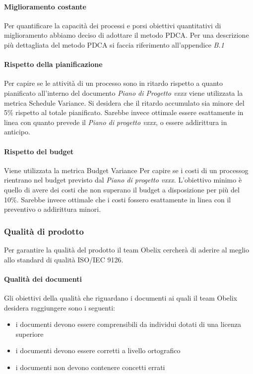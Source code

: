 \paragraph{Miglioramento costante}
Per quantificare la capacità dei processi e porsi obiettivi quantitativi di miglioramento abbiamo deciso di adottare il metodo PDCA. Per una descrizione più dettagliata del metodo PDCA si faccia riferimento all'appendice \emph{B.1}

\paragraph{Rispetto della pianificazione}
Per capire se le attività di un processo sono in ritardo rispetto a quanto pianificato all'interno del documento \emph{Piano di Progetto vxxx} viene utilizzata la metrica Schedule Variance. Si desidera che il ritardo accumulato sia minore del 5\% rispetto al totale pianificato. Sarebbe invece ottimale essere esattamente in linea con quanto prevede il \emph{Piano di progetto vxxx}, o essere addirittura in anticipo.

\paragraph{Rispetto del budget}
Viene utilizzata la metrica Budget Variance Per capire se i costi di un processog rientrano nel budget previsto dal \emph{Piano di progetto vxxx}.
L’obiettivo minimo è quello di avere dei costi che non superano il budget a disposizione per più del 10\%. Sarebbe invece ottimale che i costi fossero esattamente in linea con il preventivo o addirittura minori.

\subsubsection{Qualità di prodotto}
Per garantire la qualità del prodotto il team Obelix cercherà
di aderire al meglio allo standard di qualità ISO/IEC 9126.

\paragraph{Qualità dei documenti} 
Gli obiettivi della qualità che riguardano i documenti ai quali il team Obelix desidera raggiungere sono i seguenti: 
\begin{itemize}
\item i documenti devono essere comprensibili da individui dotati di una licenza superiore
\item i documenti devono essere corretti a livello ortografico
\item i documenti non devono contenere concetti errati
\end{itemize}

